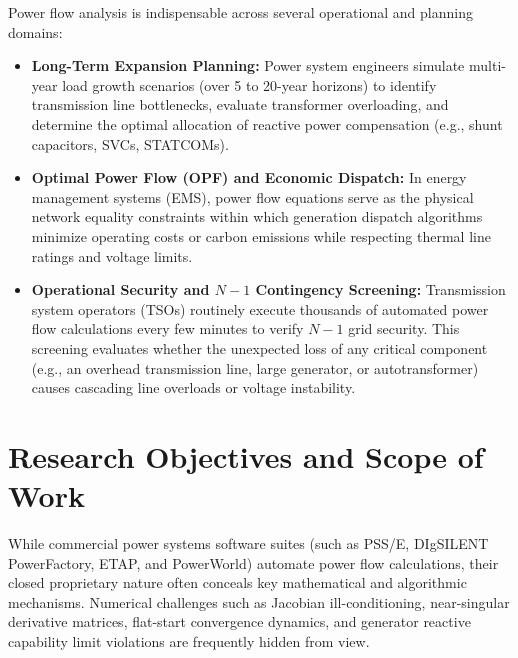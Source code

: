 \documentclass[12pt,a4paper,oneside]{report}
\begin{document}
Power flow analysis is indispensable across several operational and planning domains:
\begin{itemize}
    \item \textbf{Long-Term Expansion Planning:} Power system engineers simulate multi-year load growth scenarios (over 5 to 20-year horizons) to identify transmission line bottlenecks, evaluate transformer overloading, and determine the optimal allocation of reactive power compensation (e.g., shunt capacitors, SVCs, STATCOMs).
    \item \textbf{Optimal Power Flow (OPF) and Economic Dispatch:} In energy management systems (EMS), power flow equations serve as the physical network equality constraints within which generation dispatch algorithms minimize operating costs or carbon emissions while respecting thermal line ratings and voltage limits.
    \item \textbf{Operational Security and $N-1$ Contingency Screening:} Transmission system operators (TSOs) routinely execute thousands of automated power flow calculations every few minutes to verify $N-1$ grid security. This screening evaluates whether the unexpected loss of any critical component (e.g., an overhead transmission line, large generator, or autotransformer) causes cascading line overloads or voltage instability.
\end{itemize}

\section{Research Objectives and Scope of Work}
While commercial power systems software suites (such as PSS/E, DIgSILENT PowerFactory, ETAP, and PowerWorld) automate power flow calculations, their closed proprietary nature often conceals key mathematical and algorithmic mechanisms. Numerical challenges such as Jacobian ill-conditioning, near-singular derivative matrices, flat-start convergence dynamics, and generator reactive capability limit violations are frequently hidden from view.
\end{document}
